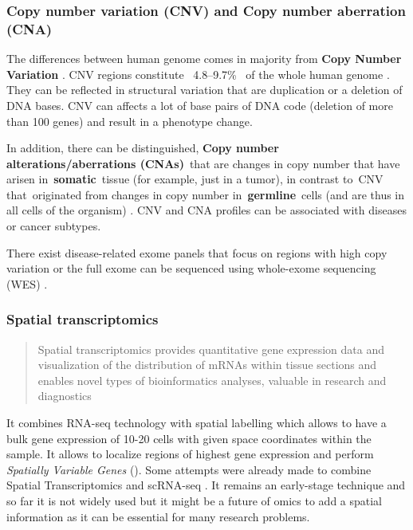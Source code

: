 \documentclass[12pt,]{book}
\theoremstyle{definition}
\theoremstyle{definition}
\theoremstyle{definition}
\theoremstyle{remark}
\begin{document}
\hypertarget{copy-number-variation-cnv-and-copy-number-aberration-cna}{%
\subsubsection{Copy number variation (CNV) and Copy number aberration
(CNA)}\label{copy-number-variation-cnv-and-copy-number-aberration-cna}}

The differences between human genome comes in majority from \textbf{Copy
Number Variation }\citep{McCarroll2007}. CNV regions constitute
~4.8--9.7\%~ of the whole human genome \citep{Zarrei2015}. They can be
reflected in structural variation that are duplication or a deletion of
DNA bases. CNV can affects a lot of base pairs of DNA code (deletion of
more than 100 genes) and result in a phenotype change.

In addition, there can be distinguished, \textbf{Copy number
alterations/aberrations (CNAs)}~that are changes in copy number that
have arisen in~\textbf{somatic}~tissue (for example, just in a tumor),
in contrast to~CNV that~originated from changes in copy number
in~\textbf{germline}~cells (and are thus in all cells of the organism)
\citep{McCarroll2007}. CNV and CNA profiles can be associated with
diseases or cancer subtypes.

There exist disease-related exome panels that focus on regions with high
copy variation or the full exome can be sequenced using whole-exome
sequencing (WES) \citep{Yamamoto2016}.

\hypertarget{spatial-transcriptomics}{%
\subsubsection{Spatial transcriptomics}\label{spatial-transcriptomics}}

\begin{quote}
Spatial transcriptomics provides quantitative gene expression data and
visualization of the distribution of mRNAs within tissue sections and
enables novel types of bioinformatics analyses, valuable in research and
diagnostics \citep{Stahl2016}
\end{quote}

It combines RNA-seq technology with spatial labelling which allows to
have a bulk gene expression of 10-20 cells with given space coordinates
within the sample. It allows to localize regions of highest gene
expression and perform \emph{Spatially Variable Genes}
(\citet{Svensson2018}). Some attempts were already made to combine
Spatial Transcriptomics and scRNA-seq \citep{Moncada2018}. It remains an
early-stage technique and so far it is not widely used but it might be a
future of omics to add a spatial information as it can be essential for
many research problems.
\end{document}
